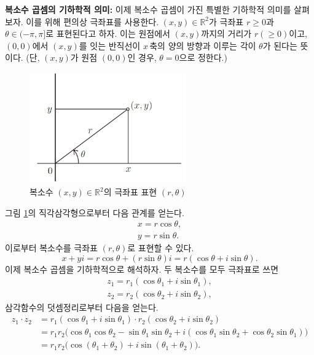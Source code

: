 {\bf  복소수 곱셈의 기하학적 의미: }
이제 복소수 곱셈이 가진 특별한 기하학적 의미를 살펴보자.
이를 위해 편의상 극좌표를 사용한다.
$(x,y)\in\mathbb R^2$가 극좌표 $r\ge 0$과 $\theta\in(-\pi,\pi]$로 표현된다고 하자.
이는 원점에서 $(x,y)$까지의 거리가 $r(\ge0)$이고,
$(0,0)$에서 $(x,y)$를 잇는 반직선이 $x\,$축의 양의 방향과 이루는 각이 $\theta$가 된다는 뜻이다.
(단, $(x,y)$가 원점 $(0,0)$인 경우, $\theta=0$으로 정한다.)

\begin{figure}[!h]
\begin{center}
\includegraphics[width=0.6\textwidth]{./SaltChapter/figs/fig-1-4}
\end{center}
\caption{복소수 $(x,y)\in\mathbb R^2$의 극좌표 표현 $(r, \theta)$}
\label{fig-1-4}
\end{figure}

그림 \ref{fig-1-4}의 직각삼각형으로부터 다음 관계를 얻는다.
\begin{gather*}
x = r \cos\theta, \\
y = r \sin \theta.
\end{gather*}
이로부터 복소수를 극좌표 $(r,\theta)$로 표현할 수 있다.
$$
x + yi = r\cos\theta +(r\sin \theta)i
= r(\cos\theta + i\sin \theta).
$$
이제 복소수 곱셈을 기하학적으로 해석하자.
두 복소수를 모두 극좌표로 쓰면
\begin{gather*}
z_1 = r_1 (\cos\theta_1 + i\sin\theta_1), \\
z_2 = r_2 (\cos\theta_2 + i\sin\theta_2),
\end{gather*}
삼각함수의 덧셈정리로부터 다음을 얻는다.
\begin{align*}
z_1\cdot z_2 &= r_1(\cos\theta_1+i\sin\theta_1) \cdot r_2(\cos\theta_2+i\sin\theta_2) \\
&= r_1r_2 \big(\cos\theta_1\cos\theta_2 - \sin\theta_1\sin\theta_2 +
i(\cos\theta_1\sin\theta_2 + \cos\theta_2\sin\theta_1)\big) \\
&= r_1r_2\big(\cos(\theta_1 +\theta_2) + i \sin(\theta_1 +\theta_2)\big).
\end{align*}

